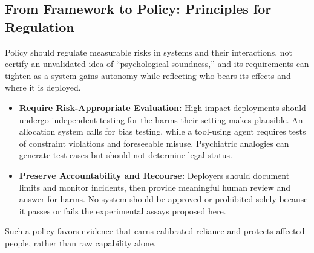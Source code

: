\documentclass{article}
\begin{document}
\subsection{From Framework to Policy: Principles for Regulation}
Policy should regulate measurable risks in systems and their interactions, not certify an unvalidated idea of ``psychological soundness,'' and its requirements can tighten as a system gains autonomy while reflecting who bears its effects and where it is deployed.
\begin{itemize}
    \item \textbf{Require Risk-Appropriate Evaluation:} High-impact deployments should undergo independent testing for the harms their setting makes plausible. An allocation system calls for bias testing, while a tool-using agent requires tests of constraint violations and foreseeable misuse. Psychiatric analogies can generate test cases but should not determine legal status.
    \item \textbf{Preserve Accountability and Recourse:} Deployers should document limits and monitor incidents, then provide meaningful human review and answer for harms. No system should be approved or prohibited solely because it passes or fails the experimental assays proposed here.
\end{itemize}
Such a policy favors evidence that earns calibrated reliance and protects affected people, rather than raw capability alone.



\end{document}
